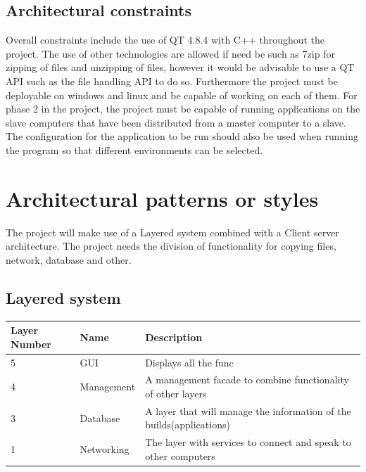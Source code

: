 \documentclass[a4paper,12pt,final]{article}
\begin{document}
\subsection{Architectural constraints}
Overall constraints include the use of QT 4.8.4 with C++ throughout the project. The use of other technologies are allowed if need be such as 7zip for zipping of files and unzipping of files, however it would be advisable to use a QT API such as the file handling API to do so. Furthermore the project must be deployable on windows and linux and be capable of working on each of them.
\vspace{6pt}\newline
For phase 2 in the project, the project must be capable of running applications on the slave computers that have been distributed from a master computer to a slave. The configuration for the application to be run should also be used when running the program so that different environments can be selected.

\section{Architectural patterns or styles}
The project will make use of a Layered system combined with a Client server architecture. The project  needs the division of functionality for copying files, network, database and other.
\vspace{6pt}\newline
\subsection{Layered system}
\begin{tabular}{|l|l|p{8cm}|}   
\hline
Layer Number & Name & Description\\
\hline
5 & GUI & Displays all the func\\
\hline
4 & Management & A management facade to combine functionality of other layers\\
\hline
3 & Database & A layer that will manage the information of the builds(applications)\\
\hline
1 & Networking & The layer with services to connect and speak to other computers\\
\hline
\end{tabular}

\end{document}
